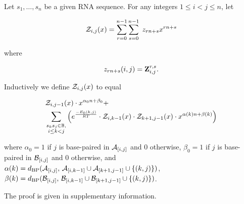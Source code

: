 \begin{theorem}
Let $s_1,\dots,s_n$ be a given RNA sequence.
For any integers $1 \leq i < j \leq n$, let

\begin{align}
{\mathcal Z}_{i,j}(x) = \sum_{r=0}^{n-1} \sum_{s=0}^{n-1}\; z_{rn+s} x^{rn+s}
\end{align}

where

\begin{align}
z_{rn+s}(i,j) = {\bf Z}^{r,s}_{i,j}.
\end{align}

Inductively we define ${\mathcal Z}_{i,j}(x)$ to equal

\begin{align}
\label{eq:polynomialRecursionNussJac}
&\emZof{i,j-1}{x} \cdot x^{\alpha_0n+\beta_0} + \\
&\sum_{\substack{s_k s_j \in \bpSet,\\i\le k<j}}
\left(e^{\frac{-E_0(k,j)}{RT}}\cdot
\emZof{i,k-1}{x} \cdot \emZof{k+1,j-1}{x}\cdot x^{\alpha(k)n+\beta(k)} \right)
\end{align}

where $\alpha_0 = 1$ if $j$ is base-paired in $\mathcal A_{[i,j]}$ and $0$ otherwise,
$\beta_0 = 1$ if $j$ is base-paired in $\mathcal B_{[i,j]}$ and $0$ otherwise, and
$\alpha(k) =
d_{\text{BP}}(\mathcal A_{[i,j]},\,\mathcal A_{[i,k-1]} \cup \mathcal A_{[k+1,j-1]} \cup \{ (k,j) \})$,
$\beta(k) =
d_{\text{BP}}(\mathcal B_{[i,j]},\,\mathcal B_{[i,k-1]} \cup \mathcal B_{[k+1,j-1]} \cup \{ (k,j) \})$.

The proof is given in supplementary information.
\end{theorem}

